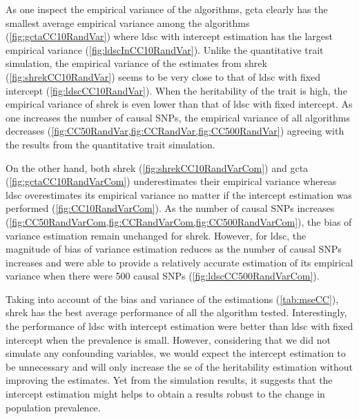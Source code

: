 		As one inspect the empirical variance of the algorithms, \gls{gcta} clearly has the smallest average empirical variance among the algorithms (\cref{fig:gctaCC10RandVar}) where \gls{ldsc} with intercept estimation has the largest empirical variance (\cref{fig:ldscInCC10RandVar}). 
		Unlike the quantitative trait simulation, the empirical variance of the estimates from \gls{shrek} (\cref{fig:shrekCC10RandVar}) seems to be very close to that of \gls{ldsc} with fixed intercept (\cref{fig:ldscCC10RandVar}).
		When the heritability of the trait is high, the empirical variance of \gls{shrek} is even lower than that of \gls{ldsc} with fixed intercept. 
		As one increases the number of causal \glspl{SNP}, the empirical variance of all algorithms decreases (\cref{fig:CC50RandVar,fig:CCRandVar,fig:CC500RandVar}) agreeing with the results from the quantitative trait simulation.
		
		On the other hand, both \gls{shrek} (\cref{fig:shrekCC10RandVarCom}) and \gls{gcta} (\cref{fig:gctaCC10RandVarCom}) underestimates their empirical variance whereas \gls{ldsc} overestimates its empirical variance no matter if the intercept estimation was performed  (\cref{fig:CC10RandVarCom}).
		As the number of causal \glspl{SNP} increases (\cref{fig:CC50RandVarCom,fig:CCRandVarCom,fig:CC500RandVarCom}), the bias of variance estimation remain unchanged for \gls{shrek}. 
		However, for \gls{ldsc}, the magnitude of bias of variance estimation reduces as the number of causal \glspl{SNP} increases and were able to provide a relatively accurate estimation of its empirical variance when there were 500 causal \glspl{SNP} (\cref{fig:ldscCC500RandVarCom}).
		
		
		Taking into account of the bias and variance of the estimations (\cref{tab:mseCC}), \gls{shrek} has the best average performance of all the algorithm tested.
		Interestingly, the performance of \gls{ldsc} with intercept estimation were better than \gls{ldsc} with fixed intercept when the prevalence is small.
		However, considering that we did not simulate any confounding variables, we would expect the intercept estimation to be unnecessary and will only increase the \gls{se} of the heritability estimation without improving the estimates.
		Yet from the simulation results, it suggests that the intercept estimation might helps to obtain a results robust to the change in population prevalence.

